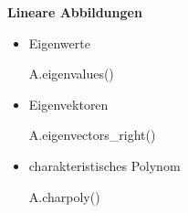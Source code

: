 \documentclass[a4paper,9pt,DIV15,twocolumn]{scrartcl}
\begin{document}
\textbf{Lineare Abbildungen}
\begin{itemize}
\item Eigenwerte
\begin{sagein}
A.eigenvalues()
\end{sagein}
 \item Eigenvektoren
\begin{sagein}
A.eigenvectors_right()
\end{sagein}
\item charakteristisches Polynom
\begin{sagein}
A.charpoly() 
\end{sagein}
\end{itemize}
\end{document}
